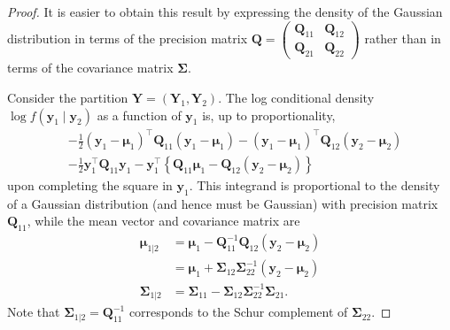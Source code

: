 \documentclass[
  11pt,
  letterpaper,
]{scrbook}
\theoremstyle{definition}
\theoremstyle{definition}
\theoremstyle{definition}
\theoremstyle{plain}
\theoremstyle{plain}
\theoremstyle{remark}
\begin{document}
\begin{proof}
It is easier to obtain this result by expressing the density of the
Gaussian distribution in terms of the precision matrix
\(\boldsymbol{Q}= \left(\begin{smallmatrix}\boldsymbol{Q}_{11} & \boldsymbol{Q}_{12}\\
\boldsymbol{Q}_{21} & \boldsymbol{Q}_{22}\end{smallmatrix}\right)\)
rather than in terms of the covariance matrix \(\boldsymbol{\Sigma}\).

Consider the partition
\(\boldsymbol{Y}=(\boldsymbol{Y}_1, \boldsymbol{Y}_2)\). The log
conditional density \(\log f(\boldsymbol{y}_1 \mid \boldsymbol{y}_2)\)
as a function of \(\boldsymbol{y}_1\) is, up to proportionality,
\begin{align*}
 &-\frac{1}{2}\left(\boldsymbol{y}_1-\boldsymbol{\mu}_1\right)^\top
\boldsymbol{Q}_{11}\left(\boldsymbol{y}_1-\boldsymbol{\mu}_1\right) - \left(\boldsymbol{y}_1-\boldsymbol{\mu}_1\right)^\top 
\boldsymbol{Q}_{12}\left(\boldsymbol{y}_2-\boldsymbol{\mu}_2\right)\\
&-\frac{1}{2}\boldsymbol{y}_1^\top\boldsymbol{Q}_{11}\boldsymbol{y}_1-\boldsymbol{y}_1^\top
\left\{\boldsymbol{Q}_{11}\boldsymbol{\mu}_1-\boldsymbol{Q}_{12}\left(\boldsymbol{y}_2-\boldsymbol{\mu}_2\right)\right\}
\end{align*} upon completing the square in \(\boldsymbol{y}_1\). This
integrand is proportional to the density of a Gaussian distribution (and
hence must be Gaussian) with precision matrix \(\boldsymbol{Q}_{11}\),
while the mean vector and covariance matrix are \begin{align*}
\boldsymbol{\mu}_{1|2} &= 
\boldsymbol{\mu}_1-\boldsymbol{Q}_{11}^{-1}\boldsymbol{Q}_{12}  \left(\boldsymbol{y}_2-\boldsymbol{\mu}_2\right)
\\&=\boldsymbol{\mu}_1+ \boldsymbol{\Sigma}_{12}\boldsymbol{\Sigma}_{22}^{-1}\left(\boldsymbol{y}_2-\boldsymbol{\mu}_2\right)
\\\boldsymbol{\Sigma}_{1|2} &= \boldsymbol{\Sigma}_{11}-\boldsymbol{\Sigma}_{12}\boldsymbol{\Sigma}_{22}^{-1}\boldsymbol{\Sigma}_{21}.
\end{align*} Note that
\(\boldsymbol{\Sigma}_{1|2}=\boldsymbol{Q}_{11}^{-1}\) corresponds to
the Schur complement of \(\boldsymbol{\Sigma}_{22}\).


\end{proof}
\end{document}
